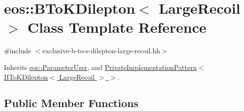 \hypertarget{classeos_1_1BToKDilepton_3_01LargeRecoil_01_4}{
\section{eos::BToKDilepton$<$ LargeRecoil $>$ Class Template Reference}
\label{classeos_1_1BToKDilepton_3_01LargeRecoil_01_4}
}


{\ttfamily \#include $<$exclusive-\/b-\/to-\/s-\/dilepton-\/large-\/recoil.hh$>$}

Inherits \hyperlink{classeos_1_1ParameterUser}{eos::ParameterUser}, and \hyperlink{classeos_1_1PrivateImplementationPattern}{PrivateImplementationPattern$<$ BToKDilepton$<$ LargeRecoil $>$ $>$}.\subsection*{Public Member Functions}
